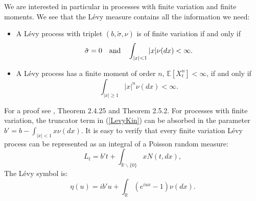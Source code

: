 \documentclass[]{interact}
\newcommand{\numberset}{\mathbb}
\newcommand{\R}{\numberset{R}}
\newcommand{\E}{\numberset{E}}
\theoremstyle{plain}%
\theoremstyle{definition}
\theoremstyle{remark}
\begin{document}
We are interested in particular in processes with finite variation and finite moments. 
We see that the Lévy measure contains all the
information we need:
\begin{itemize}
 \item A Lévy process with triplet $(b,\tilde \sigma,\nu)$ is of finite variation if and only if
 \begin{equation}\label{fin_variation} 
  \tilde \sigma = 0 \hspace{1 em}\mbox{and} \hspace{1 em} \int_{|x|<1} |x| \nu(dx) < \infty. 
 \end{equation} 
 \item A Lévy process has a finite moment of order $n$, $\E[X_t^n] < \infty$, if and only if
 \begin{equation}\label{moment_condition}
  \int_{|x|\geq 1} |x|^n \nu(dx) < \infty.
 \end{equation}
\end{itemize}
For a proof see \cite{Applebaum}, Theorem 2.4.25 and Theorem 2.5.2.
For processes with finite variation, the truncator term in (\ref{LevyKin}) can be absorbed in the parameter $b' = b - \int_{|x|<1} x \nu(dx)$.
It is easy to verify that every finite variation Lévy process can be represented as an integral of a Poisson random measure:
\begin{equation}\label{Levy_Ito_Poisson}
 L_t = b' t + \int_{\R \backslash \{0\}} x N(t,dx),
\end{equation}
The Lévy symbol is:
\begin{equation}\label{Character_Poisson}
 \eta(u) = ib'u + \int_{\R} (e^{iux} -1) \nu(dx). 
\end{equation}
\end{document}
